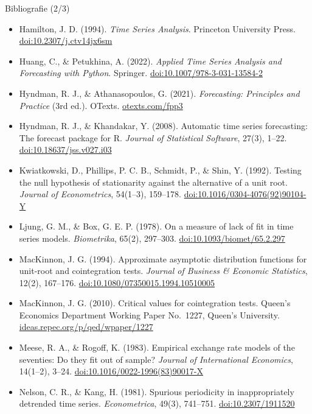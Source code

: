 \begin{frame}{Bibliografie (2/3)}
\itemsize{\scriptsize}
\begin{itemize}
    \item Hamilton, J. D. (1994). \textit{Time Series Analysis}. Princeton University Press. \href{https://doi.org/10.2307/j.ctv14jx6sm}{doi:10.2307/j.ctv14jx6sm}
    \item Huang, C., \& Petukhina, A. (2022). \textit{Applied Time Series Analysis and Forecasting with Python}. Springer. \href{https://doi.org/10.1007/978-3-031-13584-2}{doi:10.1007/978-3-031-13584-2}
    \item Hyndman, R. J., \& Athanasopoulos, G. (2021). \textit{Forecasting: Principles and Practice} (3rd ed.). OTexts. \href{https://otexts.com/fpp3/}{otexts.com/fpp3}
    \item Hyndman, R. J., \& Khandakar, Y. (2008). Automatic time series forecasting: The forecast package for R. \textit{Journal of Statistical Software}, 27(3), 1--22. \href{https://doi.org/10.18637/jss.v027.i03}{doi:10.18637/jss.v027.i03}
    \item Kwiatkowski, D., Phillips, P. C. B., Schmidt, P., \& Shin, Y. (1992). Testing the null hypothesis of stationarity against the alternative of a unit root. \textit{Journal of Econometrics}, 54(1--3), 159--178. \href{https://doi.org/10.1016/0304-4076(92)90104-Y}{doi:10.1016/0304-4076(92)90104-Y}
    \item Ljung, G. M., \& Box, G. E. P. (1978). On a measure of lack of fit in time series models. \textit{Biometrika}, 65(2), 297--303. \href{https://doi.org/10.1093/biomet/65.2.297}{doi:10.1093/biomet/65.2.297}
    \item MacKinnon, J. G. (1994). Approximate asymptotic distribution functions for unit-root and cointegration tests. \textit{Journal of Business \& Economic Statistics}, 12(2), 167--176. \href{https://doi.org/10.1080/07350015.1994.10510005}{doi:10.1080/07350015.1994.10510005}
    \item MacKinnon, J. G. (2010). Critical values for cointegration tests. Queen's Economics Department Working Paper No.~1227, Queen's University. \href{https://ideas.repec.org/p/qed/wpaper/1227.html}{ideas.repec.org/p/qed/wpaper/1227}
    \item Meese, R. A., \& Rogoff, K. (1983). Empirical exchange rate models of the seventies: Do they fit out of sample? \textit{Journal of International Economics}, 14(1--2), 3--24. \href{https://doi.org/10.1016/0022-1996(83)90017-X}{doi:10.1016/0022-1996(83)90017-X}
    \item Nelson, C. R., \& Kang, H. (1981). Spurious periodicity in inappropriately detrended time series. \textit{Econometrica}, 49(3), 741--751. \href{https://doi.org/10.2307/1911520}{doi:10.2307/1911520}
\end{itemize}
\end{frame}

